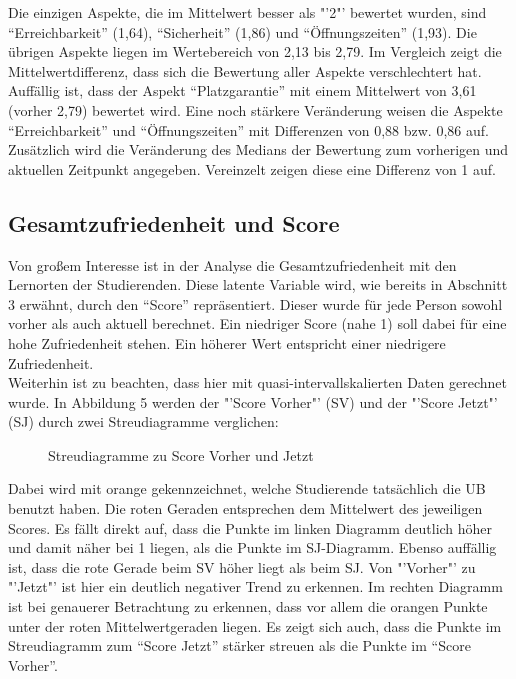 \documentclass[11pt, a4paper]{article}
\begin{document}
Die einzigen Aspekte, die im Mittelwert besser als "'2"' bewertet wurden, sind “Erreichbarkeit” (1,64), “Sicherheit” (1,86) und “Öffnungszeiten” (1,93). Die übrigen Aspekte liegen im Wertebereich von 2,13 bis 2,79.
Im Vergleich zeigt die Mittelwertdifferenz, dass sich die Bewertung aller Aspekte verschlechtert hat. Auffällig ist, dass der Aspekt “Platzgarantie” mit einem Mittelwert von 3,61 (vorher 2,79) bewertet wird. Eine noch stärkere Veränderung weisen die Aspekte “Erreichbarkeit” und “Öffnungszeiten” mit Differenzen von 0,88 bzw. 0,86 auf.
Zusätzlich wird die Veränderung des Medians der Bewertung zum vorherigen und aktuellen Zeitpunkt angegeben. Vereinzelt zeigen diese eine Differenz von 1 auf.
\subsection{Gesamtzufriedenheit und Score}



Von großem Interesse ist in der Analyse die Gesamtzufriedenheit mit den Lernorten der Studierenden.
Diese latente Variable wird, wie bereits in Abschnitt 3 erwähnt, durch den “Score” repräsentiert. Dieser wurde für jede Person sowohl vorher als auch aktuell berechnet.
Ein niedriger Score (nahe 1) soll dabei für eine hohe Zufriedenheit stehen. Ein höherer Wert entspricht einer niedrigere Zufriedenheit.\\
Weiterhin ist zu beachten, dass hier mit quasi-intervallskalierten Daten gerechnet wurde.
In Abbildung 5 werden der "'Score Vorher"' (SV) und der "'Score Jetzt"' (SJ) durch zwei Streudiagramme verglichen:

\vspace{-0.5cm}
\begin{figure}[h]

\vspace{-1.8cm}
\caption{Streudiagramme zu Score Vorher und Jetzt}
\end{figure}
\vspace{0.5cm}
Dabei wird mit orange gekennzeichnet, welche Studierende tatsächlich die UB benutzt haben. Die roten Geraden entsprechen dem Mittelwert des jeweiligen Scores.
Es fällt direkt auf, dass die Punkte im linken Diagramm deutlich höher und damit näher bei 1 liegen, als die Punkte im SJ-Diagramm.
Ebenso auffällig ist, dass die rote Gerade beim SV höher liegt als beim SJ.
Von "'Vorher"' zu "'Jetzt"' ist hier ein deutlich negativer Trend zu erkennen.
Im rechten Diagramm ist bei genauerer Betrachtung zu erkennen, dass vor allem die orangen Punkte unter der roten Mittelwertgeraden liegen.
Es zeigt sich auch, dass die Punkte im Streudiagramm zum “Score Jetzt” stärker streuen als die Punkte im “Score Vorher”.\\
\end{document}
